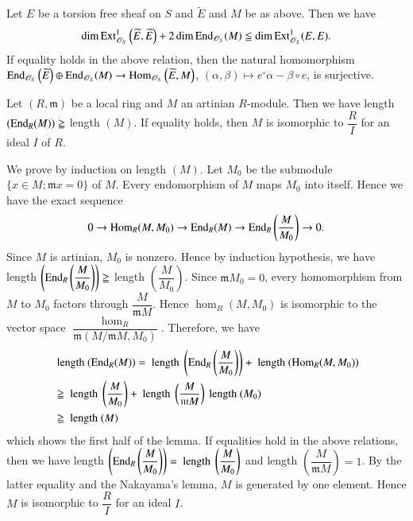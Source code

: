 \begin{cor}\label{cor2.12}\pageoriginale
Let $E$ be a torsion free sheaf on $S$ and $\widetilde{E}$ and $M$ be
as above. Then we have 
$$
\dim \mathrm{Ext}^{1}_{\mathscr{O}_S}\left(\widetilde{E},\widetilde{E}\right)+2
\dim \mathrm{End}_{\mathscr{O}_S}(M)\leqq \dim \mathrm{Ext}^{1}_{\mathscr{O}_S}(E,E).
$$
If equality holds in the above relation, then the natural homomorphism
$\mathrm{End}_{\mathscr{O}_S}\left(\widetilde{E}\right)\oplus
\mathrm{End}_{\mathscr{O}_S}(M)\to \mathrm{Hom}_{\mathscr{O}_S}\left(\widetilde{E},M\right)$,
$(\alpha,\beta)\mapsto e^{\circ}\alpha-\beta\circ e$, is surjective. 
\end{cor}

\begin{lemma}\label{lemma2.13}
Let $(R,\mathfrak{m})$ be a local ring and $M$ an artinian
$R$-module. Then we have length $(\mathrm{End}_R(M))\geqq $ length $(M)$. If
equality holds, then $M$ is isomorphic to $\dfrac{R}{I}$ for an ideal
$I$ of $R$.
\end{lemma}

\begin{Proof}
We prove by induction on length $(M)$. Let $M_0$ be the submodule
$\{x\in M;\mathfrak{m} x=0\}$ of $M$. Every endomorphism of $M$ maps
$M_0$ into itself. Hence we have the exact sequence 
$$
0\to \mathrm{Hom}_R(M,M_0)\to \mathrm{End}_R(M)\to
\mathrm{End}_R \left(\dfrac{M}{M_0}\right)\to 0.
$$
Since $M$ is artinian, $M_0$ is nonzero. Hence by induction
hypothesis, we have length $\left(\mathrm{End}_R\left(\dfrac{M}{M_0}\right)\right)\geqq$
length $\left(\dfrac{M}{M_0}\right)$. Since $\mathfrak{m} M_0=0$, every
homomorphism from $M$ to $M_0$ factors through
$\dfrac{M}{\mathfrak{m}M}$. Hence $\hom_R(M,M_0)$ is isomorphic to the
vector space
$\dfrac{\hom_R}{\mathfrak{m}(M/\mathfrak{m}M,M_0)}$. Therefore, we
have 
$$
\begin{aligned}
&\text{ length } (\mathrm{End}_R(M))= \text{ length } \left(\mathrm{End}_R\left(\dfrac{M}{M_0}\right)\right)+
\text{ length } (\mathrm{Hom}_R(M,M_0))\\
&\geqq \text{  length } \left(\dfrac{M}{M_0}\right)+\text{ length
} \left(\dfrac{M}{\mathfrak{m}M}\right) \text{ length }(M_0)\\
&\geqq \text{ length }(M)
\end{aligned}
$$\pageoriginale
which shows the first half of the lemma. If equalities hold in the
above relations, then we have length
$\left(\mathrm{End}_R\left(\dfrac{M}{M_0}\right)\right)=\text{ length
}\left(\dfrac{M}{M_0}\right)$ and length
$\left(\dfrac{M}{\mathfrak{m}M}\right)=1$. By the latter equality and
the Nakayama's lemma, $M$ is generated by one element. Hence $M$ is
isomorphic to $\dfrac{R}{I}$ for an ideal $I$.
\enprf
\end{Proof}

